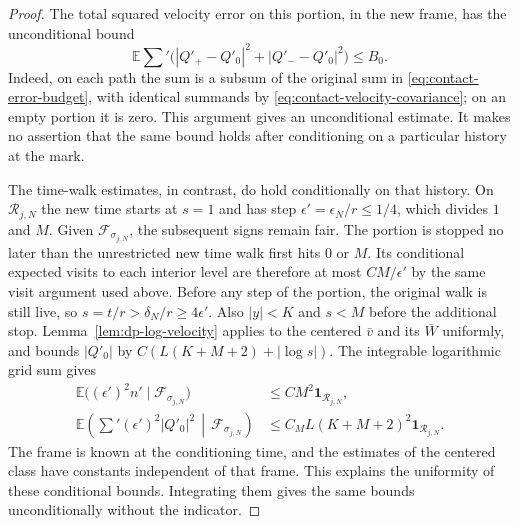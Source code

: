 \begin{proof}
The total squared velocity error on this portion, in the new frame, has the
unconditional bound
\begin{equation}\label{eq:contact-frame-error-budget}
  \mathbb E\sum'
       \bigl(|Q'_+-Q'_0|^2+|Q'_--Q'_0|^2\bigr)\le B_0.
\end{equation}
Indeed, on each path the sum is a subsum of the original sum in
\eqref{eq:contact-error-budget}, with identical summands by
\eqref{eq:contact-velocity-covariance}; on an empty portion it is zero.
This argument gives an unconditional estimate.  It makes no assertion that
the same bound holds after conditioning on a particular history at the
mark.

The time-walk estimates, in contrast, do hold conditionally on that history.
On $\mathcal R_{j,N}$ the new time starts at $s=1$ and has step
$\epsilon'=\epsilon_N/r\le1/4$, which divides $1$ and $M$.  Given
$\mathcal F_{\sigma_{j,N}}$, the subsequent signs remain fair.  The portion
is stopped no later than the unrestricted new time walk first hits $0$ or
$M$.  Its conditional expected visits to each interior level are therefore
at most $CM/\epsilon'$ by the same visit argument used above.  Before any
step of the portion, the original walk is still live, so
$s=t/r>\delta_N/r\ge4\epsilon'$.  Also $|y|<K$ and $s<M$ before the
additional stop.  Lemma~\ref{lem:dp-log-velocity} applies to the centered
$\bar v$ and its $\bar W$ uniformly, and bounds $|Q'_0|$ by
$C(L(K+M+2)+|\log s|)$.  The integrable logarithmic grid sum gives
\begin{equation}\label{eq:contact-frame-time-budget}
\begin{split}
  \mathbb E\bigl((\epsilon')^2n'\mid\mathcal F_{\sigma_{j,N}}\bigr)
       &\le CM^2\mathbf1_{\mathcal R_{j,N}},\\
  \mathbb E\left(\sum'
          (\epsilon')^2|Q'_0|^2\,\middle|\,\mathcal F_{\sigma_{j,N}}\right)
       &\le C_M L(K+M+2)^2\mathbf1_{\mathcal R_{j,N}}.
\end{split}
\end{equation}
The frame is known at the conditioning time, and the estimates of the
centered class have constants independent of that frame.  This explains the
uniformity of these conditional bounds.  Integrating them gives the same
bounds unconditionally without the indicator.


\end{proof}
